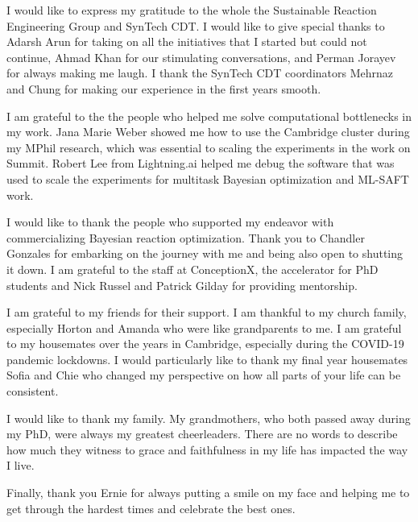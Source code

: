 I would like to express my gratitude to the whole the Sustainable Reaction Engineering Group and SynTech CDT. I would like to give special thanks to Adarsh Arun for taking on all the initiatives that I started but could not continue, Ahmad Khan for our stimulating conversations, and Perman Jorayev for always making me laugh. I thank the SynTech CDT coordinators Mehrnaz and Chung for making our experience in the first years smooth.

I am grateful to the the people who helped me solve computational bottlenecks in my work. Jana Marie Weber showed me how to use the Cambridge cluster during my MPhil research, which was essential to scaling the experiments in the work on Summit. Robert Lee from Lightning.ai helped me debug the software that was used to scale the experiments for multitask Bayesian optimization and ML-SAFT work. 

I would like to thank the people who supported my endeavor with commercializing Bayesian reaction optimization. Thank you to  Chandler Gonzales  for embarking on the journey with me and being also open to shutting it down.  I am grateful to the staff at ConceptionX, the accelerator for PhD students and Nick Russel and Patrick Gilday for providing mentorship.  

I am grateful to my friends for their support. I am thankful to my church family, especially Horton and Amanda who were like grandparents to me. I am grateful to my housemates over the years in Cambridge, especially during the COVID-19 pandemic lockdowns. I would particularly like to thank my final year housemates Sofia and Chie who changed my perspective on how all parts of your life can be consistent. 

I would like to thank my family. My grandmothers, who both passed away during my PhD, were always my greatest cheerleaders. There are no words to describe how much they witness to grace and faithfulness in my life has impacted the way I live. 

Finally, thank you Ernie for always putting a smile on my face and helping me to get through the hardest times and celebrate the best ones.

\endgroup



